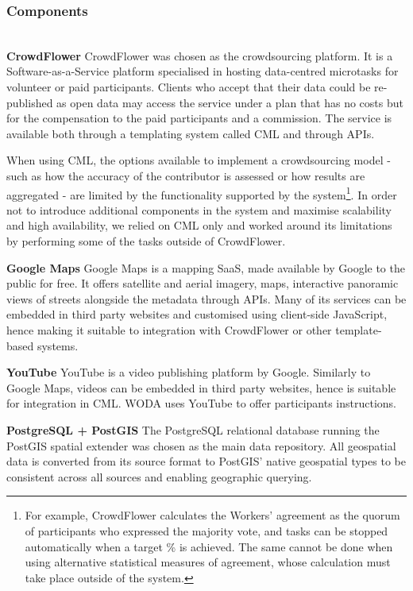 \subsubsection{Components} \leavevmode \\ %

\textbf{CrowdFlower} CrowdFlower was chosen as the crowdsourcing platform. It is a Software-as-a-Service platform specialised in hosting data-centred microtasks for volunteer or paid participants. Clients who accept that their data could be re-published as open data may access the service under a plan that has no costs but for the compensation to the paid participants and a commission. The service is available both through a templating system called CML and through APIs. 

When using CML, the options available to implement a crowdsourcing model - such as how the accuracy of the contributor is assessed or how results are aggregated - are limited by the functionality supported by the system\footnote{For example, CrowdFlower calculates the Workers' agreement as the quorum of participants who expressed the majority vote, and tasks can be stopped automatically when a target \% is achieved. The same cannot be done when using alternative statistical measures of agreement, whose calculation must take place outside of the system.}. In order not to introduce additional components in the system and maximise scalability and high availability, we relied on CML only and worked around its limitations by performing some of the tasks outside of CrowdFlower. 

\textbf{Google Maps} Google Maps is a mapping SaaS, made available by Google to the public for free. It offers satellite and aerial imagery, maps, interactive panoramic views of streets alongside the metadata through APIs. Many of its services can be embedded in third party websites and customised using client-side JavaScript, hence making it suitable to integration with CrowdFlower or other template-based systems. 

\textbf{YouTube} YouTube is a video publishing platform by Google. Similarly to Google Maps, videos can be embedded in third party websites, hence is suitable for integration in CML. WODA uses YouTube to offer participants instructions.  

\textbf{PostgreSQL + PostGIS} The PostgreSQL relational database running the PostGIS spatial extender was chosen as the main data repository. All geospatial data is converted from its source format to PostGIS' native geospatial types to be consistent across all sources and enabling geographic querying. 

